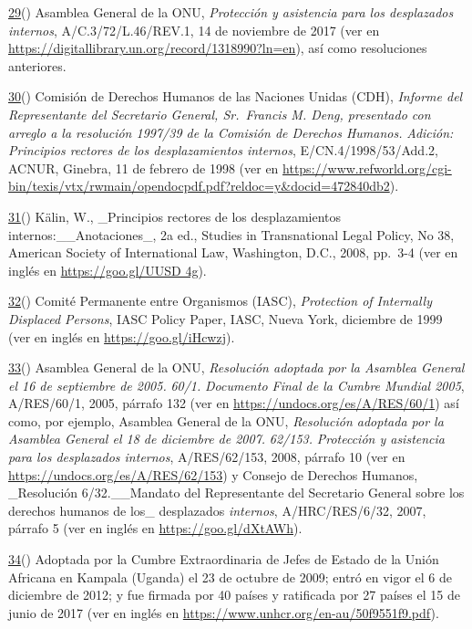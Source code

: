 \documentclass[
]{book}
\begin{document}
\protect\hyperlink{sdfootnote29anc}{29}() Asamblea General de la ONU, \emph{Protección y asistencia para los desplazados internos}, A/C.3/72/L.46/REV.1, 14 de noviembre de 2017 (ver en \url{https://digitallibrary.un.org/record/1318990?ln=en}), así como resoluciones anteriores.

\protect\hyperlink{sdfootnote30anc}{30}() Comisión de Derechos Humanos de las Naciones Unidas (CDH), \emph{Informe del Representante del Secretario General, Sr.~Francis M. Deng, presentado con arreglo a la resolución 1997/39 de la Comisión de Derechos Humanos.} \emph{Adición:} \emph{Principios rectores de los desplazamientos internos}, E/CN.4/1998/53/Add.2, ACNUR, Ginebra, 11 de febrero de 1998 (ver en \url{https://www.refworld.org/cgi-bin/texis/vtx/rwmain/opendocpdf.pdf?reldoc=y\&docid=472840db2}).

\protect\hyperlink{sdfootnote31anc}{31}() Kälin, W., \_Principios rectores de los desplazamientos internos:\_\_Anotaciones\_, 2a ed., Studies in Transnational Legal Policy, No 38, American Society of International Law, Washington, D.C., 2008, pp.~3-4 (ver en inglés en \href{https://goo.gl/UUSD4g}{https://goo.gl/UUSD 4g}).

\protect\hyperlink{sdfootnote32anc}{32}() Comité Permanente entre Organismos (IASC), \emph{Protection of Internally Displaced Persons}, IASC Policy Paper, IASC, Nueva York, diciembre de 1999 (ver en inglés en \href{https://interagencystandingcommittee.org/focal-points/documents-public/iasc-policy-paper-protection-internally-displaced-persons-1999}{https://goo.gl/iHcwzj}).

\protect\hyperlink{sdfootnote33anc}{33}() Asamblea General de la ONU, \emph{Resolución adoptada por la Asamblea General el 16 de septiembre de 2005.} \emph{60/1.} \emph{Documento Final de la Cumbre Mundial 2005}, A/RES/60/1, 2005, párrafo 132 (ver en \url{https://undocs.org/es/A/RES/60/1}) así como, por ejemplo, Asamblea General de la ONU, \emph{Resolución adoptada por la Asamblea General el 18 de diciembre de 2007.} \emph{62/153.} \emph{Protección y asistencia para los desplazados internos}, A/RES/62/153, 2008, párrafo 10 (ver en \url{https://undocs.org/es/A/RES/62/153}) y Consejo de Derechos Humanos, \_Resolución 6/32.\_\_Mandato del Representante del Secretario General sobre los derechos humanos de los\_ desplazados \emph{internos}, A/HRC/RES/6/32, 2007, párrafo 5 (ver en inglés en \url{https://goo.gl/dXtAWh}).

\protect\hyperlink{sdfootnote34anc}{34}() Adoptada por la Cumbre Extraordinaria de Jefes de Estado de la Unión Africana en Kampala (Uganda) el 23 de octubre de 2009; entró en vigor el 6 de diciembre de 2012; y fue firmada por 40 países y ratificada por 27 países el 15 de junio de 2017 (ver en inglés en \url{https://www.unhcr.org/en-au/50f9551f9.pdf}).
\end{document}
